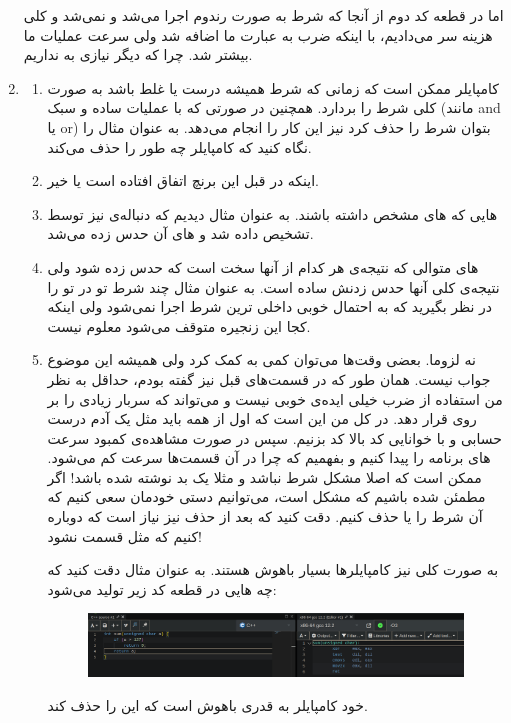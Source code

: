 \begin{enumerate}
    اما در قطعه کد دوم از آنجا که شرط به صورت رندوم اجرا می‌شد و نمی‌شد و کلی هزینه سر
    می‌دادیم،‌ با اینکه ضرب به عبارت ما اضافه شد ولی سرعت عملیات ما بیشتر شد. چرا که دیگر نیازی به
    نداریم.
    \item \begin{enumerate}
        \item کامپایلر ممکن است که زمانی که شرط همیشه درست یا غلط باشد به صورت کلی شرط را بردارد.
        همچنین در صورتی که با عملیات ساده و سبک (مانند and یا or)
        بتوان شرط را حذف کرد نیز این کار را انجام می‌دهد. به عنوان مثال
        را نگاه کنید که کامپایلر چه طور 
        را حذف می‌کند.
        \item اینکه در قبل این برنچ اتفاق افتاده است یا خیر.
        \item {}هایی
        که های
        مشخص داشته باشند. به عنوان مثال دیدیم که دنباله‌ی
        \lr{1010101\dots}
        نیز توسط
        تشخیص داده شد و های
        آن حدس زده می‌شد.
        \item {}های
        متوالی که نتیجه‌ی هر کدام از آنها سخت است که حدس زده شود ولی نتیجه‌ی کلی آنها
        حدس زدنش ساده است. به عنوان مثال چند شرط تو در تو را در نظر بگیرید که به احتمال خوبی
        داخلی ترین شرط اجرا نمی‌شود ولی اینکه کجا این زنجیره متوقف می‌شود معلوم نیست.
        \item نه لزوما. بعضی وقت‌ها می‌توان کمی به
        کمک کرد ولی همیشه این موضوع جواب نیست. همان طور که در قسمت‌های قبل نیز گفته بودم، حداقل
        به نظر من استفاده از ضرب خیلی ایده‌ی خوبی نیست و می‌تواند که سربار زیادی را بر روی
        قرار دهد. در کل
        من این است که اول از همه باید مثل یک آدم درست حسابی و با خوانایی کد بالا کد بزنیم. سپس
        در صورت مشاهده‌ی کمبود سرعت
        های
        برنامه را پیدا کنیم و بفهمیم که چرا در آن قسمت‌ها سرعت کم می‌شود. ممکن است که اصلا مشکل
        شرط نباشد و مثلا یک
        بد نوشته شده باشد!
        اگر مطمئن شده باشیم که مشکل
        است، می‌توانیم دستی خودمان سعی ‌کنیم که آن شرط را یا حذف کنیم. دقت کنید که بعد از حذف نیز
        نیاز است که دوباره
        کنیم که مثل قسمت
        نشود!

        به صورت کلی نیز کامپایلر‌ها بسیار باهوش هستند. به عنوان مثال دقت کنید که چه
        هایی
        در قطعه کد زیر تولید می‌شود:
        \begin{figure}[H]
            \centerline{\includegraphics[scale=0.3]{pics/5/godbolt-verdict.png}}
        \end{figure}
        خود کامپایلر به قدری باهوش است که این
        را حذف کند.
    \end{enumerate}
\end{enumerate}